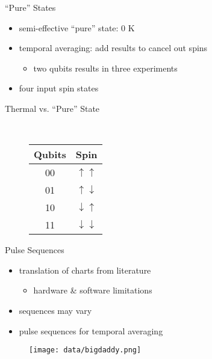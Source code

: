 \documentclass{beamer}
\begin{document}
\begin{frame}{``Pure'' States}
	\begin{itemize}
	\item semi-effective ``pure'' state: 0 K
	\vspace{1em}
	\item temporal averaging: add results to cancel out spins
	\begin{itemize}
		\item two qubits results in three experiments
	\end{itemize}
	\vspace{1em}
	\item four input spin states
	\end{itemize}
\end{frame}

\begin{frame}{Thermal vs. ``Pure'' State}
	\begin{figure}[htb]
	\begin{minipage}{0.8\textwidth}
		\begin{centering}
	\begin{figure}
		\\
	\end{figure}
		\end{centering}
	\end{minipage}%
	\begin{minipage}[t]{0.2\textwidth}
	\begin{centering}
	\begin{tabular}{c | c}
		Qubits & Spin \\
		\hline
		00 & $\uparrow \uparrow$ \\
		01 & $\uparrow \downarrow$ \\
		10 & $\downarrow \uparrow$ \\
		11 & $\downarrow \downarrow$ \\
	\end{tabular}
	\end{centering}
	\end{minipage}%
	\end{figure}

\end{frame}

\begin{frame}{Pulse Sequences}
	\begin{itemize}
	\item translation of charts from literature
	\begin{itemize}
		\item hardware \& software limitations
	\end{itemize}
	\item sequences may vary
	\item pulse sequences for temporal averaging\cite{bigdaddy}
	\end{itemize}
	\begin{figure}
		\texttt{[image: data/bigdaddy.png]}
	\end{figure}
\end{frame}
\end{document}

